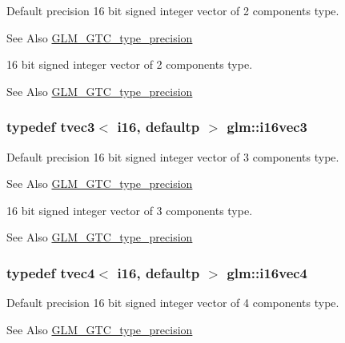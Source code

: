 Default precision 16 bit signed integer vector of 2 components type. \begin{DoxySeeAlso}{See Also}
\hyperlink{group__gtc__type__precision}{G\-L\-M\-\_\-\-G\-T\-C\-\_\-type\-\_\-precision}
\end{DoxySeeAlso}
16 bit signed integer vector of 2 components type. \begin{DoxySeeAlso}{See Also}
\hyperlink{group__gtc__type__precision}{G\-L\-M\-\_\-\-G\-T\-C\-\_\-type\-\_\-precision} 
\end{DoxySeeAlso}
\hypertarget{group__gtc__type__precision_ga85e903f028d903b416a1119b00af57ea}{
\subsubsection[{i16vec3}]{\setlength{\rightskip}{0pt plus 5cm}typedef tvec3$<$ i16, defaultp $>$ {\bf glm\-::i16vec3}}}\label{group__gtc__type__precision_ga85e903f028d903b416a1119b00af57ea}
Default precision 16 bit signed integer vector of 3 components type. \begin{DoxySeeAlso}{See Also}
\hyperlink{group__gtc__type__precision}{G\-L\-M\-\_\-\-G\-T\-C\-\_\-type\-\_\-precision}
\end{DoxySeeAlso}
16 bit signed integer vector of 3 components type. \begin{DoxySeeAlso}{See Also}
\hyperlink{group__gtc__type__precision}{G\-L\-M\-\_\-\-G\-T\-C\-\_\-type\-\_\-precision} 
\end{DoxySeeAlso}
\hypertarget{group__gtc__type__precision_gaf074450c0e60b45114084b1df4012a1d}{
\subsubsection[{i16vec4}]{\setlength{\rightskip}{0pt plus 5cm}typedef tvec4$<$ i16, defaultp $>$ {\bf glm\-::i16vec4}}}\label{group__gtc__type__precision_gaf074450c0e60b45114084b1df4012a1d}
Default precision 16 bit signed integer vector of 4 components type. \begin{DoxySeeAlso}{See Also}
\hyperlink{group__gtc__type__precision}{G\-L\-M\-\_\-\-G\-T\-C\-\_\-type\-\_\-precision}
\end{DoxySeeAlso}
